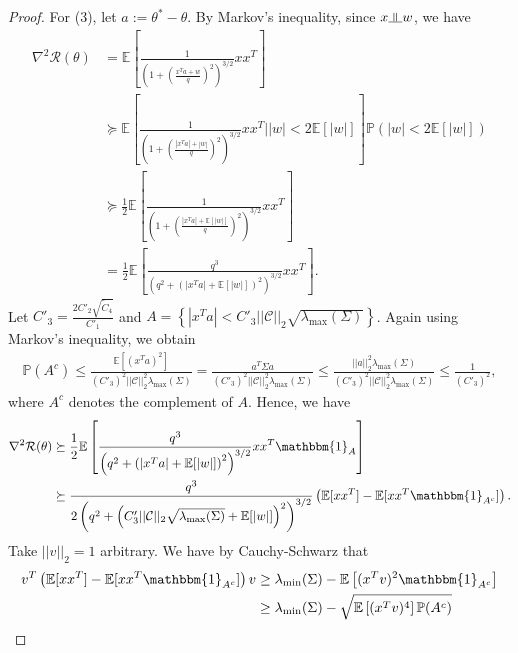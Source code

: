 \documentclass[10pt,a4paper]{amsart}
\newcommand{\indep}{\rotatebox[origin=c]{90}{$\models$}}
\begin{document}
\begin{proof}
For (3), let $a := \theta^* - \theta$. By Markov's inequality, since $x \indep w$, we have
\begin{align*}
\nabla^2\mathcal{R}(\theta) &= \mathbb{E}\left[\frac{1}{\left(1 + \left(\frac{x^Ta + w}{q}\right)^2\right)^{3/2}}xx^T\right] \\
%
& \succeq \mathbb{E}\left[\frac{1}{\left(1 + \left(\frac{|x^Ta| + |w|}{q}\right)^2\right)^{3/2}}xx^T\bigg\rvert|w| < 2\mathbb{E}[|w|]\right]\mathbb{P}(|w| < 2\mathbb{E}[|w|])\\
&\succeq \frac{1}{2}\mathbb{E}\left[\frac{1}{\left(1 + \left(\frac{|x^Ta| + \mathbb{E}[|w|]}{q}\right)^2\right)^{3/2}}xx^T\right]\\ 
&= \frac{1}{2}\mathbb{E}\left[\frac{q^3}{\left(q^2 + \left(|x^Ta| + \mathbb{E}[|w|]\right)^2\right)^{3/2}}xx^T\right].
\end{align*}
Let $C'_3 = \frac{2C'_2\sqrt{\widetilde{C}_4}}{C'_1}$ and $A = \left\{|x^Ta| < C'_3||\mathcal{C}||_2\sqrt{\lambda_{\max}(\Sigma)}\right\}$. Again using Markov's inequality, we obtain
\begin{align*}
\mathbb{P}(A^c) \leq \frac{\mathbb{E}\left[(x^Ta)^2\right]}{(C'_3)^2||\mathcal{C}||_2^2\lambda_{\max}(\Sigma)} = \frac{a^T\Sigma a}{(C'_3)^2||\mathcal{C}||_2^2\lambda_{\max}(\Sigma)} \leq \frac{||a||_2^2\lambda_{\max}(\Sigma)}{(C'_3)^2||\mathcal{C}||_2^2\lambda_{\max}(\Sigma)} \leq \frac{1}{(C'_3)^2},
\end{align*}
where $A^c$ denotes the complement of $A$. Hence, we have
\begin{align*}
\nabla^2\mathcal{R}(\theta) &\succeq \frac{1}{2}\mathbb{E}\left[\frac{q^3}{\left(q^2 + \left(|x^Ta| + \mathbb{E}[|w|]\right)^2\right)^{3/2}}xx^T\mathbbm{1}_A\right]\\
&\succeq \frac{q^3}{2\left(q^2 + \left(C'_3||\mathcal{C}||_2\sqrt{\lambda_{\max}(\Sigma)} + \mathbb{E}[|w|]\right)^2\right)^{3/2}}\left(\mathbb{E}[xx^T] - \mathbb{E}[xx^T\mathbbm{1}_{A^c}]\right).
\end{align*}
Take $||v||_2 = 1$ arbitrary. We have by Cauchy-Schwarz that
\begin{align*}
v^T\left(\mathbb{E}[xx^T] - \mathbb{E}[xx^T\mathbbm{1}_{A^c}]\right)v &\geq \lambda_{\min}(\Sigma) - \mathbb{E}\left[(x^Tv)^2\mathbbm{1}_{A^c}\right]\\
&\geq \lambda_{\min}(\Sigma) - \sqrt{\mathbb{E}\left[(x^Tv)^4\right]\mathbb{P}(A^c)}\\

\end{align*}
\end{proof}
\end{document}
